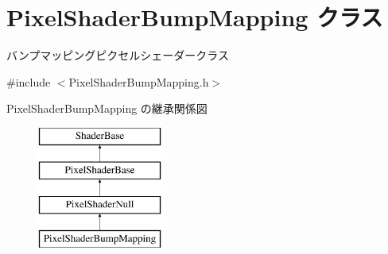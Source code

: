\hypertarget{class_pixel_shader_bump_mapping}{}\section{Pixel\+Shader\+Bump\+Mapping クラス}
\label{class_pixel_shader_bump_mapping}


バンプマッピングピクセルシェーダークラス  




{\ttfamily \#include $<$Pixel\+Shader\+Bump\+Mapping.\+h$>$}

Pixel\+Shader\+Bump\+Mapping の継承関係図\begin{figure}[H]
\begin{center}
\leavevmode
\includegraphics[height=4.000000cm]{class_pixel_shader_bump_mapping}
\end{center}
\end{figure}
